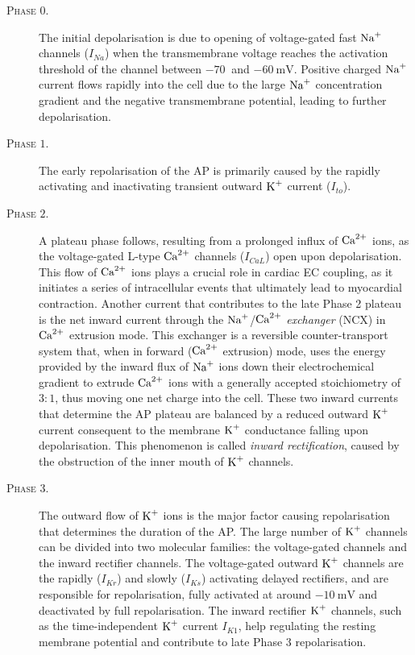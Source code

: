 \begin{description}
	\item[\textsc{Phase $0$.}] The initial depolarisation is due to opening of voltage-gated fast $\textrm{Na}^{+}$ channels ($I_{Na}$) when the transmembrane voltage reaches the activation threshold of the channel between $\SI{-70}{}$ and $\SI{-60}{\milli\volt}$. Positive charged $\textrm{Na}^{+}$ current flows rapidly into the cell due to the large $\textrm{Na}^{+}$ concentration gradient and the negative transmembrane potential, leading to further depolarisation.
	\item[\textsc{Phase $1$.}] The early repolarisation of the AP is primarily caused by the rapidly activating and inactivating transient outward $\textrm{K}^{+}$ current ($I_{to}$).
	\item[\textsc{Phase $2$.}] A plateau phase follows, resulting from a prolonged influx of $\textrm{Ca}^{2+}$ ions, as the voltage-gated L-type $\textrm{Ca}^{2+}$ channels ($I_{CaL}$) open upon depolarisation. This flow of $\textrm{Ca}^{2+}$ ions plays a crucial role in cardiac EC coupling, as it initiates a series of intracellular events that ultimately lead to myocardial contraction. Another current that contributes to the late Phase 2 plateau is the net inward current through the $\textrm{Na}^{+}$/$\textrm{Ca}^{2+}$ \textit{exchanger} (\acs{NCX}) in $\textrm{Ca}^{2+}$ extrusion mode. This exchanger is a reversible counter-transport system that, when in forward ($\textrm{Ca}^{2+}$ extrusion) mode, uses the energy provided by the inward flux of $\textrm{Na}^{+}$ ions down their electrochemical gradient to extrude $\textrm{Ca}^{2+}$ ions with a generally accepted stoichiometry of $3\colon 1$, thus moving one net charge into the cell. These two inward currents that determine the AP plateau are balanced by a reduced outward $\textrm{K}^{+}$ current consequent to the membrane $\textrm{K}^{+}$ conductance falling upon depolarisation. This phenomenon is called \textit{inward rectification}, caused by the obstruction of the inner mouth of $\textrm{K}^{+}$ channels.
	\item[\textsc{Phase $3$.}] The outward flow of $\textrm{K}^{+}$ ions is the major factor causing repolarisation that determines the duration of the AP. The large number of $\textrm{K}^{+}$ channels can be divided into two molecular families: the voltage-gated channels and the inward rectifier channels. The voltage-gated outward $\textrm{K}^{+}$ channels are the rapidly ($I_{Kr}$) and slowly ($I_{Ks}$) activating delayed rectifiers, and are responsible for repolarisation, fully activated at around $\SI{-10}{\milli\volt}$ and deactivated by full repolarisation. The inward rectifier $\textrm{K}^{+}$ channels, such as the time-independent $\textrm{K}^{+}$ current $I_{K1}$, help regulating the resting membrane potential and contribute to late Phase $3$ repolarisation.

\end{description}
